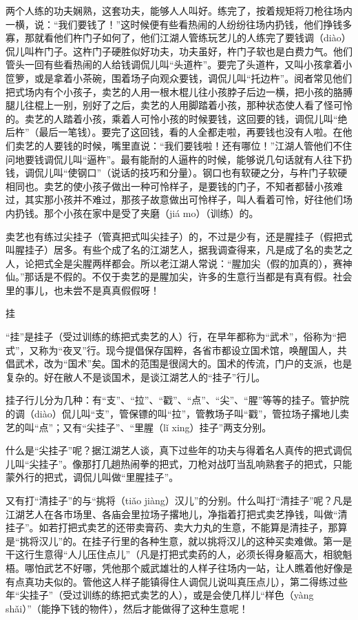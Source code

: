 \documentclass[12pt,UTF8]{ctexbook}
\begin{document}
两个人练的功夫娴熟，这套功夫，能够人人叫好。练完了，按着规矩将刀枪往场内一横，说：“我们要钱了！”这时候便有些看热闹的人纷纷往场内扔钱，他们挣钱多寡，那就看他们杵门子如何了，他们江湖人管练玩艺儿的人练完了要钱调（diào）侃儿叫杵门子。这杵门子硬胜似好功夫，功夫虽好，杵门子软也是白费力气。他们管头一回有些看热闹的人给钱调侃儿叫“头道杵”。要完了头道杵，又叫小孩拿着小笸箩，或是拿着小茶碗，围着场子向观众要钱，调侃儿叫“托边杵”。阅者常见他们把式场内有个小孩子，卖艺的人用一根木棍儿往小孩脖子后边一横，把小孩的胳膊腿儿往棍上一别，别好了之后，卖艺的人用脚踏着小孩，那种状态使人看了怪可怜的。卖艺的人踏着小孩，乘着人可怜小孩的时候要钱，这回要的钱，调侃儿叫“绝后杵”（最后一笔钱）。要完了这回钱，看的人全都走啦，再要钱也没有人啦。在他们卖艺的人要钱的时候，嘴里直说：“我们要钱啦！还有哪位！”江湖人管他们不住问地要钱调侃儿叫“逼杵”。最有能耐的人逼杵的时候，能够说几句话就有人往下扔钱，调侃儿叫“使钢口”（说话的技巧和分量）。钢口也有软硬之分，与杵门子软硬相同也。卖艺的使小孩子做出一种可怜样子，是要钱的门子，不知者都替小孩难过，其实那小孩并不难过，那孩子故意做出可怜样子，叫人看着可怜，好往他们场内扔钱。那个小孩在家中是受了夹磨（jiá mo）（训练）的。

卖艺也有练过尖挂子（管真把式叫尖挂子）的，不过是少有，还是腥挂子（假把式叫腥挂子）居多。有些个成了名的江湖艺人，据我调查得来，凡是成了名的卖艺之人，论把式全是尖腥两样都会。所以老江湖人常说：“腥加尖（假的加真的），赛神仙。”那话是不假的。不仅于卖艺的是腥加尖，许多的生意行当都是有真有假。社会里的事儿，也未尝不是真真假假呀！





挂


“挂”是挂子（受过训练的练把式卖艺的人）行，在早年都称为“武术”，俗称为“把式”，又称为“夜叉”行。现今提倡保存国粹，各省市都设立国术馆，唤醒国人，共倡武术，改为“国术”矣。国术的范围是很阔大的。国术的传流，门户的支派，也是复杂的。好在敝人不是谈国术，是谈江湖艺人的“挂子”行儿。

挂子行儿分为几种：有“支”、“拉”、“戳”、“点”、“尖”、“腥”等等的挂子。管护院的调（diào）侃儿叫“支”，管保镖的叫“拉”，管教场子叫“戳”，管拉场子撂地儿卖艺的叫“点”；又有“尖挂子”、“里腥（lǐ xing）挂子”两支分别。

什么是“尖挂子”呢？据江湖艺人谈，真下过些年的功夫与得着名人真传的把式调侃儿叫“尖挂子”。像那打几趟热闹拳的把式，刀枪对战叮当乱响熟套子的把式，只能蒙外行的把式，调侃儿叫做“里腥挂子”。

又有打“清挂子”的与“挑将（tiǎo jiàng）汉儿”的分别。什么叫打“清挂子”呢？凡是江湖艺人在各市场里、各庙会里拉场子撂地儿，净指着打把式卖艺挣钱，叫做“清挂子”。如若打把式卖艺的还带卖膏药、卖大力丸的生意，不能算是清挂子，那算是“挑将汉儿”的。在挂子行里的各种生意，就以挑将汉儿的这种买卖难做。第一是干这行生意得“人儿压住点儿”（凡是打把式卖药的人，必须长得身躯高大，相貌魁梧。哪怕武艺不好哪，凭他那个威武雄壮的人样子往场内一站，让人瞧着他好像是有点真功夫似的。管他这人样子能镇得住人调侃儿说叫真压点儿），第二得练过些年“尖挂子”（受过训练的练把式卖艺的人），或是会使几样儿“样色（yàng shǎi）”（能挣下钱的物件），然后才能做得了这种生意呢！
\end{document}
